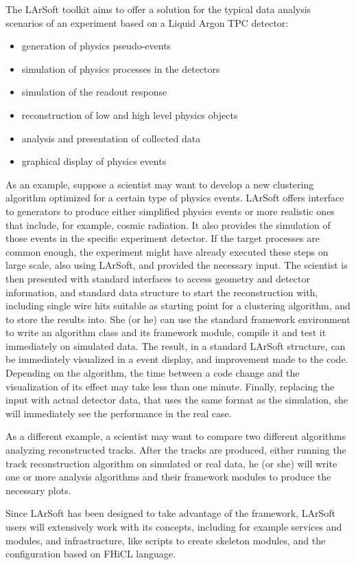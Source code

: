 
% 
% 

The LArSoft toolkit aims to offer a solution for the typical data analysis scenarios
of an experiment based on a Liquid Argon TPC detector:
\begin{itemize}
  \item generation of physics pseudo-events
  \item simulation of physics processes in the detectors
  \item simulation of the readout response
  \item reconstruction of low and high level physics objects
  \item analysis and presentation of collected data
  \item graphical display of physics events
\end{itemize}

As an example, suppose a scientist may want to develop a new clustering algorithm
optimized for a certain type of physics events.
LArSoft offers interface to generators to produce either simplified physics events
or more realistic ones that include, for example, cosmic radiation.
It also provides the simulation of those events in the specific experiment detector.
If the target processes are common enough, the experiment might have already
executed these steps on large scale, also using LArSoft, and provided the necessary input.
The scientist is then presented with standard interfaces to access geometry and detector
information, and standard data structure to start the reconstruction with,
including single wire hits suitable as starting point for a clustering algorithm,
and to store the results into.
She (or he) can use the standard framework environment to write an algorithm class
and its framework module, compile it and test it immediately on simulated data.
The result, in a standard LArSoft structure, can be immediately visualized in a
event display, and improvement made to the code.
Depending on the algorithm, the time between a code change and the
visualization of its effect may take less than one minute.
Finally, replacing the input with actual detector data, that uses the same format
as the simulation, she will immediately see the performance in the real case.

As a different example, a scientist may want to compare two different algorithms
analyzing reconstructed tracks.
After the tracks are produced, either running the track reconstruction algorithm
on simulated or real data, he (or she) will write one or more analysis algorithms
and their framework modules to produce the necessary plots.

Since LArSoft has been designed to take advantage of the \ART framework\cite{ART},
LArSoft users will extensively work with its concepts,
including for example services and modules, and infrastructure, like \ART scripts
to create skeleton modules, and the configuration based on FHiCL language\cite{FHiCL}.

